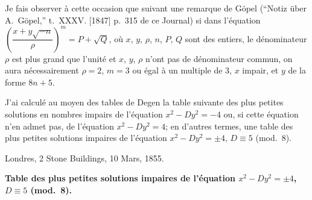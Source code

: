 \documentclass[11pt,a4paper]{book}
\theoremstyle{plain}
\begin{document}
Je fais observer \`{a} cette occasion que suivant une remarque de G\"{o}pel (``Notiz \"{u}ber A.~G\"{o}pel,'' t.~XXXV. [1847] p.~315 de ce Journal) si dans l'\'{e}quation $\left(\dfrac{x+y\sqrt{-n}}{\rho}\right)^m=P+\sqrt{Q}$, o\`{u} $x$, $y$, $\rho$, $n$, $P$, $Q$ sont des entiers, le d\'{e}nominateur $\rho$ est plus grand que l'unit\'{e} et $x$, $y$, $\rho$ n'ont pas de d\'{e}nominateur commun, on aura n\'{e}cessairement $\rho=2$, $m=3$ ou \'{e}gal \`{a} un multiple de 3, $x$ impair, et $y$ de la forme $8n+5$.

J'ai calcul\'{e} au moyen des tables de Degen la table suivante des plus petites solutions en nombres impairs de l'\'{e}quation $x^2-Dy^2=-4$ ou, si cette \'{e}quation n'en admet pas, de l'\'{e}quation $x^2-Dy^2=4$; en d'autres termes, une table des plus petites solutions impaires de l'\'{e}quation $x^2-Dy^2=\pm 4$, $D\equiv 5$ (mod.~8).

\begin{flushright}
Londres, 2 Stone Buildings, 10 Mars, 1855.
\end{flushright}

\bigskip

\begin{center}
\textbf{Table des plus petites solutions impaires de l'\'{e}quation $x^2-Dy^2=\pm4$, $D\equiv5$ (mod.~8).}
\end{center}
\end{document}
